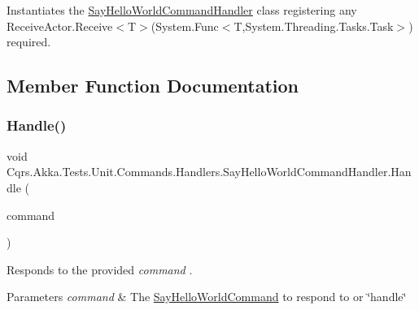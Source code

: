 Instantiates the \hyperlink{classCqrs_1_1Akka_1_1Tests_1_1Unit_1_1Commands_1_1Handlers_1_1SayHelloWorldCommandHandler}{Say\+Hello\+World\+Command\+Handler} class registering any Receive\+Actor.\+Receive$<$\+T$>$(\+System.\+Func$<$\+T,\+System.\+Threading.\+Tasks.\+Task$>$) required. 



\subsection{Member Function Documentation}
\mbox{\label{classCqrs_1_1Akka_1_1Tests_1_1Unit_1_1Commands_1_1Handlers_1_1SayHelloWorldCommandHandler_a204e1dacbacfb172a47d1585b76ef1f4_a204e1dacbacfb172a47d1585b76ef1f4}} 
\subsubsection{\texorpdfstring{Handle()}{Handle()}}
{\footnotesize\ttfamily void Cqrs.\+Akka.\+Tests.\+Unit.\+Commands.\+Handlers.\+Say\+Hello\+World\+Command\+Handler.\+Handle (\begin{DoxyParamCaption}\item[{\hyperlink{classCqrs_1_1Akka_1_1Tests_1_1Unit_1_1Commands_1_1SayHelloWorldCommand}{Say\+Hello\+World\+Command}}]{command }\end{DoxyParamCaption})}



Responds to the provided {\itshape command} . 


\begin{DoxyParams}{Parameters}
{\em command} & The \hyperlink{classCqrs_1_1Akka_1_1Tests_1_1Unit_1_1Commands_1_1SayHelloWorldCommand}{Say\+Hello\+World\+Command} to respond to or \char`\"{}handle\char`\"{}\\
\hline
\end{DoxyParams}


